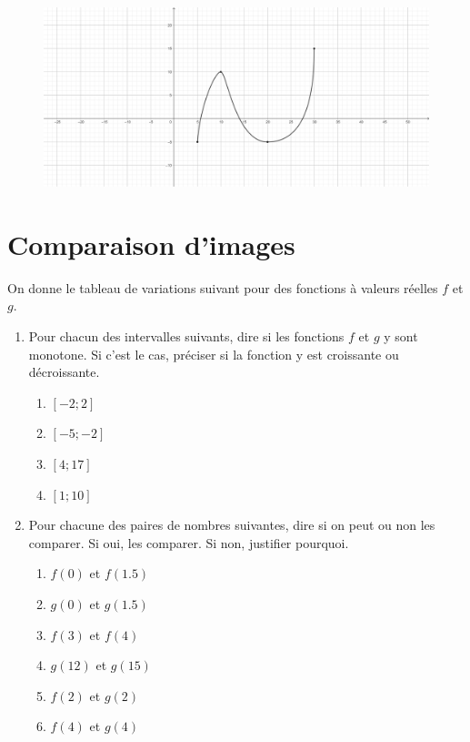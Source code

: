 \documentclass{article}
\begin{document}
\begin{figure}[h!]
\begin{minipage}[t]{0.6\textwidth}
\includegraphics[width=\textwidth]{"fonction3.png"}
\end{minipage}
\begin{minipage}{0.4\textwidth}

\end{minipage}
\end{figure}
\newpage
\section{Comparaison d'images}
On donne le tableau de variations suivant pour des fonctions à valeurs réelles $f$ et $g$.
\begin{center}
\end{center}
\begin{enumerate}
\item Pour chacun des intervalles suivants, dire si les fonctions $f$ et $g$ y sont monotone. Si c'est le cas, préciser si la fonction y est croissante ou décroissante.
\begin{enumerate}
\item $\left[-2;2\right]$ 
\item $\left[-5;-2\right]$ 
\item $\left[4;17\right]$
\item $\left[1;10\right]$ 
\end{enumerate}
\item Pour chacune des paires de nombres suivantes, dire si on peut ou non les comparer. Si oui, les comparer. Si non, justifier pourquoi.
\begin{enumerate}
\item $f(0)$ et $f(1.5)$
\item $g(0)$ et $g(1.5)$
\item $f(3)$ et $f(4)$
\item $g(12)$ et $g(15)$
\item $f(2)$ et $g(2)$
\item $f(4)$ et $g(4)$
\end{enumerate}
\end{enumerate}
\end{document}
